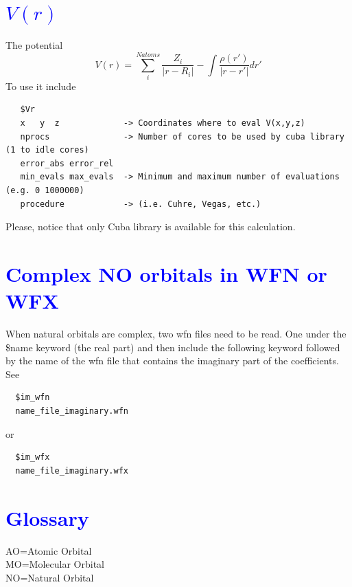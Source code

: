 \documentclass[10pt,a4paper]{article}
\newcommand{\tbl}[1]{{\textcolor{blue}{#1}}}
\begin{document}
{\section{\tbl{\textbf{$V(r)$}}}
The potential 
\begin{equation}
V(r)= \sum^{Natoms} _{i} \frac{Z_i}{|r-R_i|} - \int \frac{\rho(r')}{|r-r'|} dr'
\end{equation}
To use it include
\begin{verbatim}
   $Vr
   x   y  z             -> Coordinates where to eval V(x,y,z)
   nprocs               -> Number of cores to be used by cuba library (1 to idle cores) 
   error_abs error_rel    
   min_evals max_evals  -> Minimum and maximum number of evaluations (e.g. 0 1000000)
   procedure            -> (i.e. Cuhre, Vegas, etc.)
\end{verbatim}
Please, notice that only Cuba library is available for this calculation. 
\section{\tbl{Complex NO orbitals in WFN or WFX}}}
When natural orbitals are complex, two wfn files need to be read. One under the \$name keyword (the real part) and then include the 
following keyword followed by the name of the wfn file that contains the imaginary part of the coefficients. See
\begin{verbatim}
  $im_wfn 
  name_file_imaginary.wfn
\end{verbatim}
or
\begin{verbatim}
  $im_wfx 
  name_file_imaginary.wfx
\end{verbatim}
\section*{\tbl{\textbf{Glossary}}}
AO=Atomic Orbital\\
MO=Molecular Orbital\\
NO=Natural Orbital
\end{document}
